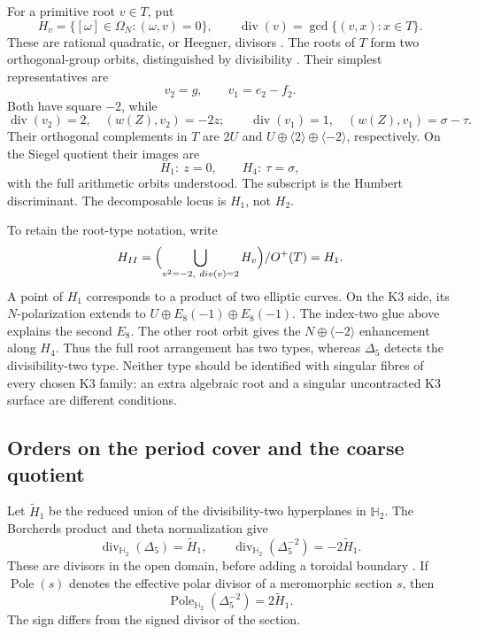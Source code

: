 For a primitive root \(v\in T\), put
\[
 H_v=\{[\omega]\in\Omega_N:(\omega,v)=0\},\qquad
 \operatorname{div}(v)=\gcd\{(v,x):x\in T\}.
\]
These are rational quadratic, or Heegner, divisors
\cite[\S2]{BruinierFunkeHeegner}. The roots of \(T\) form two
orthogonal-group orbits, distinguished by divisibility
\cite[\S3.3]{ClingherDoran2012}.
Their simplest representatives are
\[
 v_2=g,\qquad v_1=e_2-f_2.
\]
Both have square \(-2\), while
\[
 \operatorname{div}(v_2)=2,\quad (w(Z),v_2)=-2z;
 \qquad
 \operatorname{div}(v_1)=1,\quad (w(Z),v_1)=\sigma-\tau.
\]
Their orthogonal complements in \(T\) are
\(2U\) and \(U\oplus\langle2\rangle\oplus\langle-2\rangle\),
respectively. On the Siegel quotient their images are
\[
 H_1:\ z=0,\qquad H_4:\ \tau=\sigma,
\]
with the full arithmetic orbits understood. The subscript is the
Humbert discriminant. The decomposable locus is \(H_1\), not
\(H_2\).

To retain the root-type notation, write
\begin{equation}\label{eq:view4-discriminant-divisor}
 \mathfrak H_{\mathrm{II}}
   =\Bigl(\bigcup_{v^2=-2,\ \operatorname{div}(v)=2}H_v\Bigr)
       /O^+(T)=H_1.
\end{equation}
A point of \(H_1\) corresponds to a product of two elliptic curves.
On the K3 side, its \(N\)-polarization extends to
\(U\oplus E_8(-1)\oplus E_8(-1)\).
The index-two glue above explains the second \(E_8\).
The other root orbit gives the \(N\oplus\langle-2\rangle\)
enhancement along \(H_4\). Thus the full root arrangement has two
types, whereas \(\Delta_5\) detects the divisibility-two type.
Neither type should be identified with singular fibres of every
chosen K3 family: an extra algebraic root and a singular uncontracted
K3 surface are different conditions.

\subsection{Orders on the period cover and the coarse quotient}
\label{subsec:view4-divisor-orders}

Let \(\widetilde H_1\) be the reduced union of the divisibility-two
hyperplanes in \(\mathbb H_2\). The Borcherds product and theta
normalization give
\begin{equation}\label{eq:view4-divisor-of-Delta5}
 \operatorname{div}_{\mathbb H_2}(\Delta_5)=\widetilde H_1,
 \qquad
 \operatorname{div}_{\mathbb H_2}(\Delta_5^{-2})=-2\widetilde H_1.
\end{equation}
These are divisors in the open domain, before adding a toroidal
boundary \cite{GN,GNII,B}.
If \(\operatorname{Pole}(s)\) denotes the effective polar divisor
of a meromorphic section \(s\), then
\begin{equation}\label{eq:view4-conjecture}
 \operatorname{Pole}_{\mathbb H_2}(\Delta_5^{-2})=2\widetilde H_1.
\end{equation}
The sign differs from the signed divisor of the section.

